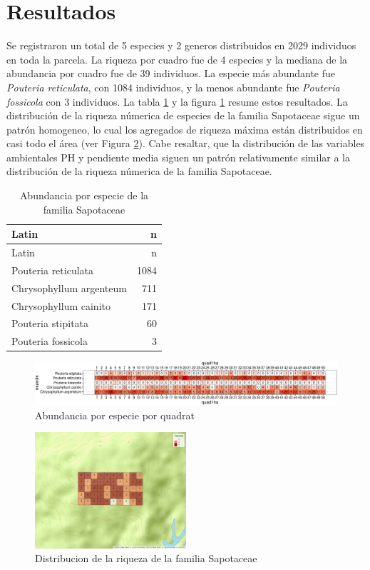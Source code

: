 \documentclass[11pt,]{article}
\begin{document}
\section{Resultados}\label{resultados}

Se registraron un total de 5 especies y 2 generos distribuidos en 2029
individuos en toda la parcela. La riqueza por cuadro fue de 4 especies y
la mediana de la abundancia por cuadro fue de 39 individuos. La especie
más abundante fue \emph{Pouteria reticulata}, con 1084 individuos, y la
menos abundante fue \emph{Pouteria fossicola} con 3 individuos. La tabla
\ref{tab:abun_sp} y la figura \ref{fig:abun_sp_q} resume estos
resultados. La distribución de la riqueza númerica de especies de la
familia Sapotaceae sigue un patrón homogeneo, lo cual los agregados de
riqueza máxima están distribuidos en casi todo el área (ver Figura
\ref{fig:mapa_cuadros_riq_mi_familia}). Cabe resaltar, que la
distribución de las variables ambientales PH y pendiente media siguen un
patrón relativamente similar a la distribución de la riqueza númerica de
la familia Sapotaceae.

\begin{longtable}[]{@{}lr@{}}
\caption{\label{tab:abun_sp}Abundancia por especie de la familia
Sapotaceae}\tabularnewline
\toprule
Latin & n\tabularnewline
\midrule
\endfirsthead
\toprule
Latin & n\tabularnewline
\midrule
\endhead
Pouteria reticulata & 1084\tabularnewline
Chrysophyllum argenteum & 711\tabularnewline
Chrysophyllum cainito & 171\tabularnewline
Pouteria stipitata & 60\tabularnewline
Pouteria fossicola & 3\tabularnewline
\bottomrule
\end{longtable}

\begin{figure}
\centering
\includegraphics{manuscrito_files/figure-latex/unnamed-chunk-3-1.pdf}
\caption{\label{fig:abun_sp_q}Abundancia por especie por quadrat}
\end{figure}

\begin{figure}
\centering
\includegraphics[width=0.50000\textwidth]{mapa_cuadros_riq_mi_familia.png}
\caption{Distribucion de la riqueza de la familia
Sapotaceae\label{fig:mapa_cuadros_riq_mi_familia}}
\end{figure}
\end{document}
